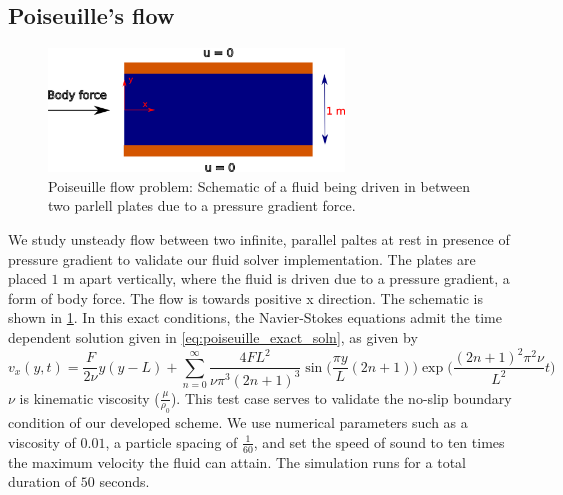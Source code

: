 \documentclass[preprint,12pt]{elsarticle}
\providecommand{\DIFaddtex}[1]{{\protect\color{blue}\uwave{#1}}} %
\providecommand{\DIFaddbegin}{} %
\providecommand{\DIFaddend}{} %
\providecommand{\DIFadd}[1]{\texorpdfstring{\DIFaddtex{#1}}{#1}} %
\newcommand{\DIFaddincludegraphics}[2][]{{\color{blue}\fbox{\DIFOincludegraphics[#1]{#2}}}} %
\DeclareRobustCommand{\DIFaddbegin}{\DIFOaddbegin \let\includegraphics\DIFaddincludegraphics} %
\DeclareRobustCommand{\DIFaddend}{\DIFOaddend \let\includegraphics\DIFOincludegraphics} %
\begin{document}
\FloatBarrier%
\subsection{Poiseuille's flow}
\label{sec:poiseuille_flow}

\begin{figure}[!htpb]
  \centering
  \includegraphics[width=0.7\textwidth]{images/fluid_01_benchmark_poisuelle/poiseuille_schematic}
  \caption{Poiseuille flow problem: Schematic of a fluid being driven in
    between two parlell plates due to a pressure gradient force.}
  \label{fig:poiseuille_schematic}
\end{figure}
We study unsteady flow between two infinite, parallel paltes at rest in
presence of pressure gradient to validate our fluid solver implementation.
The plates are placed $1$ m apart vertically, where the fluid is driven due to
a pressure gradient, a form of body force. The flow is towards positive x
direction. The schematic is shown in \cref{fig:poiseuille_schematic}.  In this
exact conditions, the Navier-Stokes equations admit the time dependent
solution given in \cref{eq:poiseuille_exact_soln}, as given by
\citet{morris1997modeling}
\begin{equation}
  \label{eq:poiseuille_exact_soln}
  v_x(y, t) = \frac{F}{2 \nu}y(y - L) + \sum_{n=0}^{\infty}\frac{4FL^2}{\nu \pi^3 (2n + 1)^3} \sin\bigg(\frac{\pi y}{L} (2 n + 1) \bigg) \exp\bigg(\frac{ (2 n + 1)^2 \pi^2 \nu}{L^2} t\bigg)
\end{equation}
$\nu$ is kinematic viscosity ($\frac{\mu}{\rho_0}$). This test case serves to
validate the no-slip boundary condition of our developed scheme. We use
numerical parameters such as a viscosity of $0.01$, a particle spacing of
$\frac{1}{60}$, and set the speed of sound to ten times the maximum velocity
\DIFaddbegin \DIFadd{that }\DIFaddend the fluid can attain. The simulation runs for a total duration of $50$
seconds.
\end{document}
